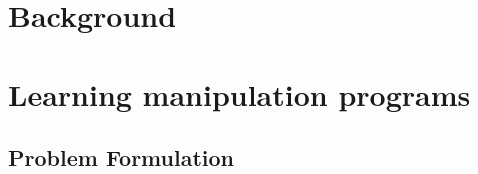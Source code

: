 \documentclass[Dual]{iitddiss}
\begin{document}
\chapter{Background}

\pagebreak

\chapter{Learning manipulation programs}
\label{chap:part-1}
% 

% 


\section{Problem Formulation}


\end{document}

